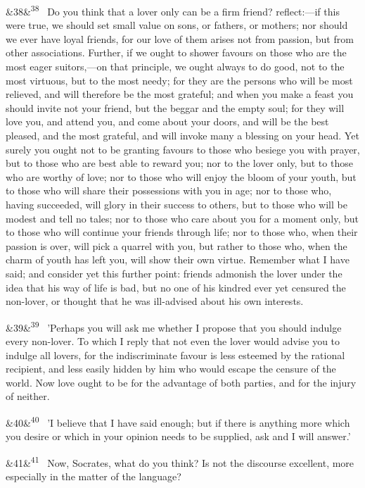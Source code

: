 \documentclass[12pt]{article}
\newcommand{\para}[1][]{\par\noindent\ifx&#1&\else\textsuperscript{\footnotesize #1}~\fi}
\begin{document}
\para[38] Do you think that a lover only can be a firm friend? reflect:---if this were true, we should set small value on sons, or fathers, or mothers; nor should we ever have loyal friends, for our love of them arises not from passion, but from other associations. Further, if we ought to shower favours on those who are the most eager suitors,---on that principle, we ought always to do good, not to the most virtuous, but to the most needy; for they are the persons who will be most relieved, and will therefore be the most grateful; and when you make a feast you should invite not your friend, but the beggar and the empty soul; for they will love you, and attend you, and come about your doors, and will be the best pleased, and the most grateful, and will invoke many a blessing on your head. Yet surely you ought not to be granting favours to those who besiege you with prayer, but to those who are best able to reward you; nor to the lover only, but to those who are worthy of love; nor to those who will enjoy the bloom of your youth, but to those who will share their possessions with you in age; nor to those who, having succeeded, will glory in their success to others, but to those who will be modest and tell no tales; nor to those who care about you for a moment only, but to those who will continue your friends through life; nor to those who, when their passion is over, will pick a quarrel with you, but rather to those who, when the charm of youth has left you, will show their own virtue. Remember what I have said; and consider yet this further point: friends admonish the lover under the idea that his way of life is bad, but no one of his kindred ever yet censured the non-lover, or thought that he was ill-advised about his own interests.

\para[39] 'Perhaps you will ask me whether I propose that you should indulge every non-lover. To which I reply that not even the lover would advise you to indulge all lovers, for the indiscriminate favour is less esteemed by the rational recipient, and less easily hidden by him who would escape the censure of the world. Now love ought to be for the advantage of both parties, and for the injury of neither.

\para[40] 'I believe that I have said enough; but if there is anything more which you desire or which in your opinion needs to be supplied, ask and I will answer.'

\para[41] Now, Socrates, what do you think? Is not the discourse excellent, more especially in the matter of the language?
\end{document}
